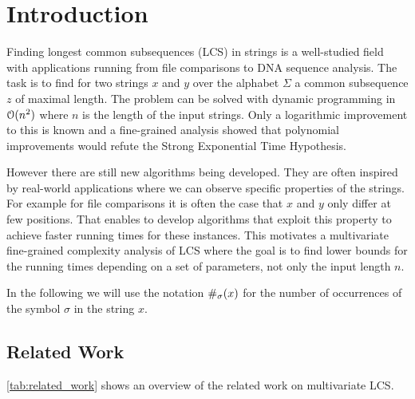 \section{Introduction}
Finding longest common subsequences (LCS) in strings is a well-studied field with applications running from file comparisons to DNA sequence analysis.
The task is to find for two strings $x$ and $y$ over the alphabet $\Sigma$ a common subsequence $z$ of maximal length.
The problem can be solved with dynamic programming in $\mathcal{O}(n^2)$ where $n$ is the length of the input strings.
Only a logarithmic improvement to this is known and a fine-grained analysis showed that polynomial improvements would refute the Strong Exponential Time Hypothesis.

However there are still new algorithms being developed.
They are often inspired by real-world applications where we can observe specific properties of the strings.
For example for file comparisons it is often the case that $x$ and $y$ only differ at few positions.
That enables to develop algorithms that exploit this property to achieve faster running times for these instances.
This motivates a multivariate fine-grained complexity analysis of LCS where the goal is to find lower bounds for the running times depending on a set of parameters, not only the input length $n$.

In the following we will use the notation $\#_{\sigma}(x)$ for the number of occurrences of the symbol $\sigma$ in the string $x$.


\subsection{Related Work}

\autoref{tab:related_work} shows an overview of the related work on multivariate LCS.

